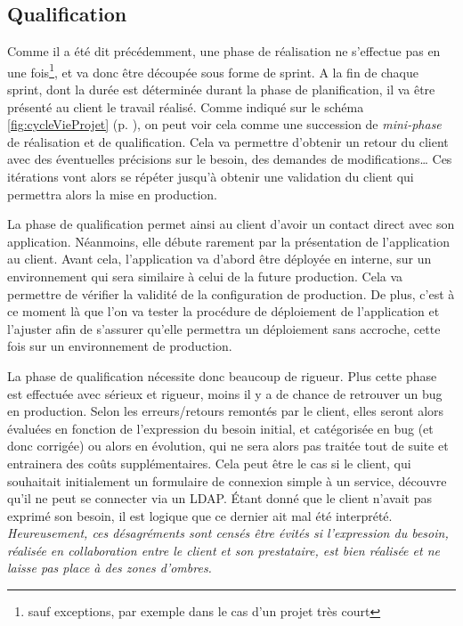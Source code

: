 \subsection{Qualification}

Comme il a été dit précédemment, une phase de réalisation ne s'effectue pas en une fois\footnote{sauf exceptions, par exemple dans le cas d'un projet très court}, et va donc être découpée sous forme de sprint. A la fin de chaque sprint, dont la durée est déterminée durant la phase de planification, il va être présenté au client le travail réalisé. Comme indiqué sur le schéma \ref{fig:cycleVieProjet} (p. \pageref{fig:cycleVieProjet}), on peut voir cela comme une succession de \emph{mini-phase} de réalisation et de qualification. Cela va permettre d'obtenir un retour du client avec des éventuelles précisions sur le besoin, des demandes de modifications\ldots{} Ces itérations vont alors se répéter jusqu'à obtenir une validation du client qui permettra alors la mise en production.

La phase de qualification permet ainsi au client d'avoir un contact direct avec son application. Néanmoins, elle débute rarement par la présentation de l'application au client. Avant cela, l'application va d'abord être déployée en interne, sur un environnement qui sera similaire à celui de la future production. Cela va permettre de vérifier la validité de la configuration de production. De plus, c'est à ce moment là que l'on va tester la procédure de déploiement de l'application et l'ajuster afin de s'assurer qu'elle permettra un déploiement sans accroche, cette fois sur un environnement de production.

La phase de qualification nécessite donc beaucoup de rigueur. Plus cette phase est effectuée avec sérieux et rigueur, moins il y a de chance de retrouver un bug en production. Selon les erreurs/retours remontés par le client, elles seront alors évaluées en fonction de l'expression du besoin initial, et catégorisée en bug (et donc corrigée) ou alors en évolution, qui ne sera alors pas traitée tout de suite et entrainera des coûts supplémentaires. Cela peut être le cas si le client, qui souhaitait initialement un formulaire de connexion simple à un service, découvre qu'il ne peut se connecter via un \gls{LDAP}. Étant donné que le client n'avait pas exprimé son besoin, il est logique que ce dernier ait mal été interprété. \emph{Heureusement, ces désagréments sont censés être évités si l'expression du besoin, réalisée en collaboration entre le client et son prestataire, est bien réalisée et ne laisse pas place à des zones d'ombres.}

